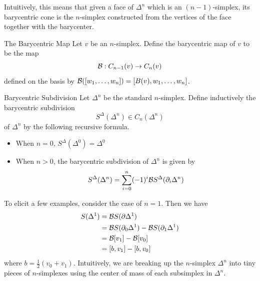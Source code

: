 \documentclass[a4paper]{article}
\begin{document}
Intuitively, this means that given a face of $\Delta^n$ which is an $(n-1)$-simplex, its barycentric cone is the $n$-simplex constructed from the vertices of the face together with the barycenter. 

\begin{defn}{The Barycentric Map}{} Let $v$ be an $n$-simplex. Define the barycentric map of $v$ to be the map $$\mathcal{B}:C_{n-1}(v)\to C_n(v)$$ defined on the basis by $\mathcal{B}([w_1,\dots,w_n])=[B(v),w_1,\dots,w_n]$. 
\end{defn}

\begin{defn}{Barycentric Subdivision}{} Let $\Delta^n$ be the standard $n$-simplex. Define inductively the barycentric subdivision $$S^\Delta(\Delta^n)\in C_n(\Delta^n)$$ of $\Delta^n$ by the following recursive formula. 
\begin{itemize}
\item When $n=0$, $S^\Delta(\Delta^0)=\Delta^0$
\item When $n>0$, the barycentric subdivision of $\Delta^n$ is given by $$S^\Delta(\Delta^n)=\sum_{i=0}^n(-1)^i\mathcal{B} S^\Delta(\partial_i\Delta^n)$$
\end{itemize}
\end{defn}

To elicit a few examples, consider the case of $n=1$. Then we have 
\begin{align*}
S(\Delta^1)&=\mathcal{B} S(\partial\Delta^1)\\
&=\mathcal{B} S(\partial_0\Delta^1)-\mathcal{B} S(\partial_1\Delta^1)\\
&=\mathcal{B}[v_1]-\mathcal{B}[v_0]\\
&=[b,v_1]-[b,v_0]
\end{align*}
where $b=\frac{1}{2}(v_0+v_1)$. Intuitively, we are breaking up the $n$-simplex $\Delta^n$ into tiny pieces of $n$-simplexes using the center of mass of each subsimplex in $\Delta^n$. 
\end{document}
